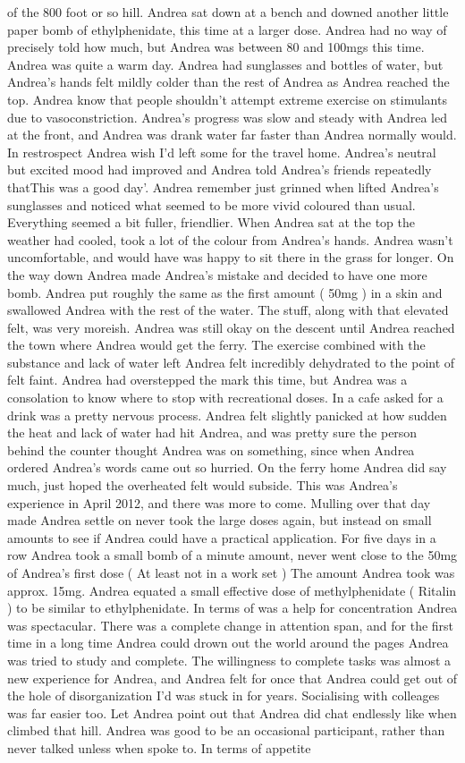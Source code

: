 \documentclass[12pt]{book}
\begin{document}
of the 800 foot or so hill. Andrea sat down at a bench and downed another little paper bomb of ethylphenidate, this time at a larger dose. Andrea had no way of precisely told how much, but Andrea was between 80 and 100mgs this time. Andrea was quite a warm day. Andrea had sunglasses and bottles of water, but Andrea's hands felt mildly colder than the rest of Andrea as Andrea reached the top. Andrea know that people shouldn't attempt extreme exercise on stimulants due to vasoconstriction. Andrea's progress was slow and steady with Andrea led at the front, and Andrea was drank water far faster than Andrea normally would. In restrospect Andrea wish I'd left some for the travel home. Andrea's neutral but excited mood had improved and Andrea told Andrea's friends repeatedly thatThis was a good day'. Andrea remember just grinned when lifted Andrea's sunglasses and noticed what seemed to be more vivid coloured than usual. Everything seemed a bit fuller, friendlier. When Andrea sat at the top the weather had cooled, took a lot of the colour from Andrea's hands. Andrea wasn't uncomfortable, and would have was happy to sit there in the grass for longer. On the way down Andrea made Andrea's mistake and decided to have one more bomb. Andrea put roughly the same as the first amount ( 50mg ) in a skin and swallowed Andrea with the rest of the water. The stuff, along with that elevated felt, was very moreish. Andrea was still okay on the descent until Andrea reached the town where Andrea would get the ferry. The exercise combined with the substance and lack of water left Andrea felt incredibly dehydrated to the point of felt faint. Andrea had overstepped the mark this time, but Andrea was a consolation to know where to stop with recreational doses. In a cafe asked for a drink was a pretty nervous process. Andrea felt slightly panicked at how sudden the heat and lack of water had hit Andrea, and was pretty sure the person behind the counter thought Andrea was on something, since when Andrea ordered Andrea's words came out so hurried. On the ferry home Andrea did say much, just hoped the overheated felt would subside. This was Andrea's experience in April 2012, and there was more to come. Mulling over that day made Andrea settle on never took the large doses again, but instead on small amounts to see if Andrea could have a practical application. For five days in a row Andrea took a small bomb of a minute amount, never went close to the 50mg of Andrea's first dose ( At least not in a work set ) The amount Andrea took was approx. 15mg. Andrea equated a small effective dose of methylphenidate ( Ritalin ) to be similar to ethylphenidate. In terms of was a help for concentration Andrea was spectacular. There was a complete change in attention span, and for the first time in a long time Andrea could drown out the world around the pages Andrea was tried to study and complete. The willingness to complete tasks was almost a new experience for Andrea, and Andrea felt for once that Andrea could get out of the hole of disorganization I'd was stuck in for years. Socialising with colleages was far easier too. Let Andrea point out that Andrea did chat endlessly like when climbed that hill. Andrea was good to be an occasional participant, rather than never talked unless when spoke to. In terms of appetite 
\end{document}
